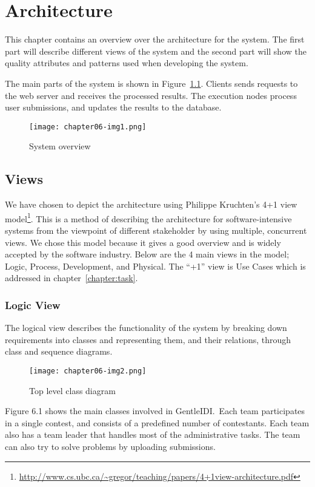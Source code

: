 
\chapter{Architecture}

This chapter contains an overview over the architecture for the system.
The first part will describe different views of the system and the
second part will show the quality attributes and patterns used when
developing the system.




The main parts of the system is shown in Figure~\ref{fig:systemOverview}. Clients sends
requests to the web server and receives the processed results. The
execution nodes process user submissions, and updates the results to
the database. 
\begin{figure}[t]
    \centering
 	\texttt{[image: chapter06-img1.png]} 
 	\caption{System overview}
 	\label{fig:systemOverview}
\end{figure}

\section{Views}

We have chosen to depict the architecture using Philippe
Kruchten's 4+1 view model\footnote{\url{http://www.cs.ubc.ca/~gregor/teaching/papers/4+1view-architecture.pdf}}. This is a method of
describing the architecture for software-intensive systems from the
viewpoint of different stakeholder by using multiple, concurrent views.
We chose this model because it gives a good overview and is widely
accepted by the software industry. Below are the 4 main views in the
model; Logic, Process, Development, and Physical. The
``+1'' view is Use Cases which is
addressed in chapter~\ref{chapter:task}.

\subsection{Logic View}
The logical view describes the functionality of the system by breaking
down requirements into classes and representing them, and their
relations, through class and sequence diagrams.
\begin{figure}[h!]
    \centering
	\texttt{[image: chapter06-img2.png]} 
	\caption{Top level class diagram}
\end{figure}

Figure 6.1 shows the main classes involved in GentleIDI.\ Each team
participates in a single contest, and consists of a predefined number
of contestants. Each team also has a team leader that handles most of
the administrative tasks. The team can also try to solve problems by
uploading submissions. 

